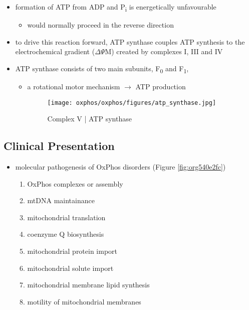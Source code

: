 \documentclass{scrartcl}
\begin{document}
\begin{enumerate}
{\small{}}

\begin{itemize}
\item formation of ATP from ADP and P\textsubscript{i} is energetically unfavourable
\begin{itemize}
\item would normally proceed in the reverse direction
\end{itemize}

\item to drive this reaction forward, ATP synthase couples ATP synthesis
to the electrochemical gradient (\(\Delta \Psi\)M) created by complexes
I, III and IV
\item ATP synthase consists of two main subunits, F\textsubscript{0} and F\textsubscript{1},
\begin{itemize}
\item a rotational motor mechanism \(\to\) ATP production

\begin{figure}[htbp]
\centering
\texttt{[image: oxphos/oxphos/figures/atp\_synthase.jpg]}
\caption{\label{fig:org72536b3}Complex V | ATP synthase}
\end{figure}
\end{itemize}
\end{itemize}
\end{enumerate}

\subsection{Clinical Presentation}
\label{sec:orgfc3dc52}
\begin{itemize}
\item molecular pathogenesis of OxPhos disorders (Figure \ref{fig:org540e2fc})
\begin{enumerate}
\item OxPhos complexes or assembly
\item mtDNA maintainance
\item mitochondrial translation
\item coenzyme Q biosynthesis
\item mitochondrial protein import
\item mitochondrial solute import
\item mitochondrial membrane lipid synthesis
\item motility of mitochondrial membranes
\end{enumerate}
\end{itemize}
\end{document}
